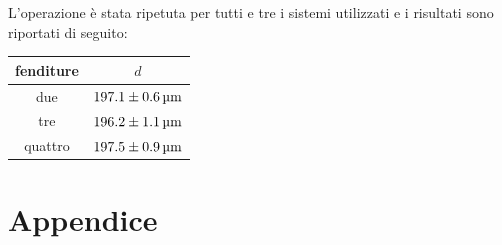 \documentclass[italian,a4paper]{article}
\begin{document}
L'operazione è stata ripetuta per tutti e tre i sistemi utilizzati e i risultati sono riportati di seguito:
\begin{table}[!h]
\centering
\begin{tabular}{cc}
fenditure&		$d$\\\hline
due&			$\unit[197.1 \pm 0.6]{\micro m}$\\
tre&			$\unit[196.2 \pm 1.1]{\micro m}$\\
quattro&		$\unit[197.5 \pm 0.9]{\micro m}$\\
\end{tabular} 
\end{table}


\newpage
\section{Appendice}
\end{document}
